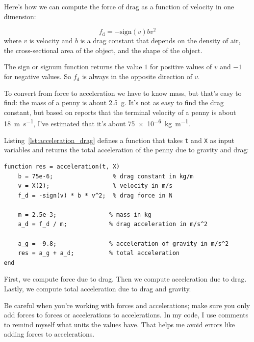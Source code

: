 Here's how we can compute the force of drag as a function of velocity in one dimension:

\begin{equation*}
    f_\mathrm{d} = -\mathrm{sign}(v) b v^2
\end{equation*}
where $v$ is velocity and
$b$ is a drag constant that depends on the density of
air, the cross-sectional area of the object, and the shape
of the object.

The sign or signum function returns the value $1$ for positive values of
$v$ and $-1$ for negative values.  So $f_\mathrm{d}$ is always in the opposite direction of $v$.


To convert from force to acceleration we have to know mass, but that's easy to find: the mass of a penny is about \SI{2.5}{\gram}.  It's not as easy to find the drag constant, but based on reports that the terminal velocity of a penny is about \SI{18}{\meter \per \second}, I've estimated that it's about \SI{75e-6}{\kilogram \per \meter}.

Listing~\ref{lst:acceleration_drag} defines a function that takes \lstinline{t} and \lstinline{X} as input variables and returns the total acceleration of the penny due to gravity and drag:

\begin{lstlisting}[caption={Calculating acceleration of a penny with drag}, label={lst:acceleration_drag}]
function res = acceleration(t, X)
    b = 75e-6;                 % drag constant in kg/m
    v = X(2);                  % velocity in m/s
    f_d = -sign(v) * b * v^2;  % drag force in N

    m = 2.5e-3;               % mass in kg
    a_d = f_d / m;            % drag acceleration in m/s^2

    a_g = -9.8;               % acceleration of gravity in m/s^2
    res = a_g + a_d;          % total acceleration
end
\end{lstlisting}

First, we compute force due to drag.
Then we compute acceleration due to drag.
Lastly, we compute total acceleration due to drag and \mbox{gravity}.


Be careful when you're working with forces and accelerations; make sure
you only add forces to forces or accelerations to accelerations.  In my
code, I use comments to remind myself what units the values have.
That helps me avoid errors like adding forces to accelerations.

